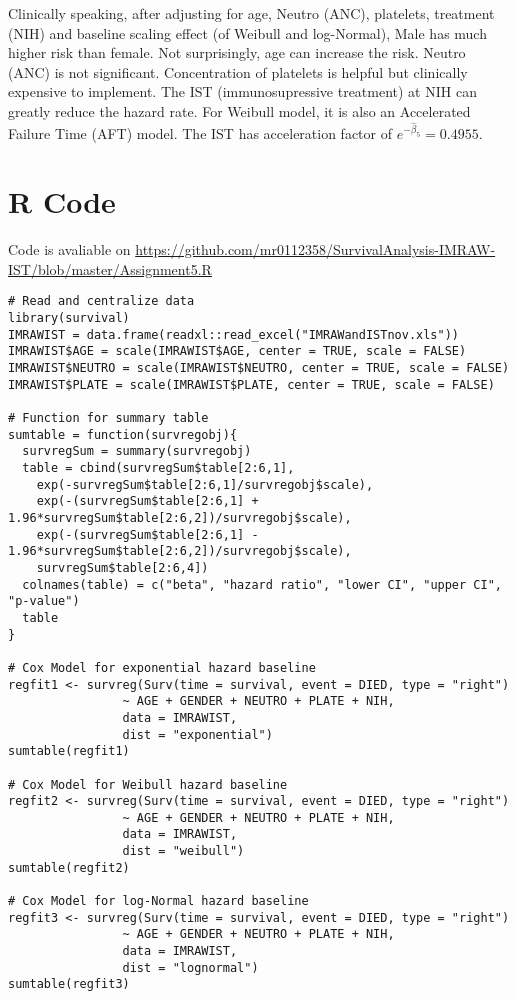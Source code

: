 \documentclass[11pt]{article}
\begin{document}
Clinically speaking, after adjusting for age, Neutro (ANC), platelets, 
treatment (NIH) and baseline scaling effect (of Weibull and log-Normal), Male
has much higher risk than female. Not surprisingly, age can increase the risk.
Neutro (ANC) is not significant. Concentration of platelets is helpful but
clinically expensive to implement. The IST (immunosupressive treatment) at NIH
can greatly reduce the hazard rate. For Weibull model, it is also an Accelerated
Failure Time (AFT) model. The IST has acceleration factor of $e^{-\hat\beta_5}
= 0.4955$.


\appendix

\section{R Code}

Code is avaliable on \url{https://github.com/mr0112358/SurvivalAnalysis-IMRAW-IST/blob/master/Assignment5.R}

\begin{lstlisting}
# Read and centralize data
library(survival)
IMRAWIST = data.frame(readxl::read_excel("IMRAWandISTnov.xls"))
IMRAWIST$AGE = scale(IMRAWIST$AGE, center = TRUE, scale = FALSE)
IMRAWIST$NEUTRO = scale(IMRAWIST$NEUTRO, center = TRUE, scale = FALSE)
IMRAWIST$PLATE = scale(IMRAWIST$PLATE, center = TRUE, scale = FALSE)

# Function for summary table
sumtable = function(survregobj){
  survregSum = summary(survregobj)
  table = cbind(survregSum$table[2:6,1],
    exp(-survregSum$table[2:6,1]/survregobj$scale), 
    exp(-(survregSum$table[2:6,1] + 1.96*survregSum$table[2:6,2])/survregobj$scale), 
    exp(-(survregSum$table[2:6,1] - 1.96*survregSum$table[2:6,2])/survregobj$scale),
    survregSum$table[2:6,4])
  colnames(table) = c("beta", "hazard ratio", "lower CI", "upper CI", "p-value")
  table
}

# Cox Model for exponential hazard baseline
regfit1 <- survreg(Surv(time = survival, event = DIED, type = "right") 
                ~ AGE + GENDER + NEUTRO + PLATE + NIH,
                data = IMRAWIST,
                dist = "exponential")
sumtable(regfit1)

# Cox Model for Weibull hazard baseline
regfit2 <- survreg(Surv(time = survival, event = DIED, type = "right") 
                ~ AGE + GENDER + NEUTRO + PLATE + NIH,
                data = IMRAWIST,
                dist = "weibull")
sumtable(regfit2)

# Cox Model for log-Normal hazard baseline
regfit3 <- survreg(Surv(time = survival, event = DIED, type = "right") 
                ~ AGE + GENDER + NEUTRO + PLATE + NIH,
                data = IMRAWIST,
                dist = "lognormal")
sumtable(regfit3)
\end{lstlisting}
\end{document}
